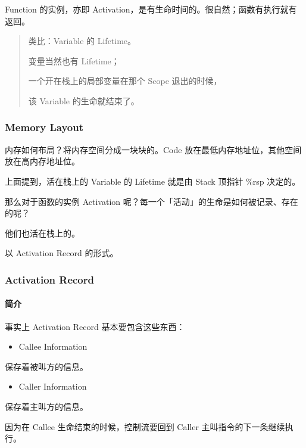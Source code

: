 \documentclass[
]{article}
\begin{document}
Function 的实例，亦即
Activation，是有生命时间的。很自然；函数有执行就有返回。

\begin{quote}
类比：Variable 的 Lifetime。

变量当然也有 Lifetime；

一个开在栈上的局部变量在那个 Scope 退出的时候，

该 Variable 的生命就结束了。
\end{quote}

\hypertarget{header-n183}{%
\subsubsection{Memory Layout}\label{header-n183}}

内存如何布局？将内存空间分成一块块的。Code
放在最低内存地址位，其他空间放在高内存地址位。

上面提到，活在栈上的 Variable 的 Lifetime 就是由 Stack 顶指针 \%rsp
决定的。

那么对于函数的实例 Activation
呢？每一个「活动」的生命是如何被记录、存在的呢？

他们也活在栈上的。

以 Activation Record 的形式。

\hypertarget{header-n189}{%
\subsubsection{Activation Record}\label{header-n189}}

\hypertarget{header-n190}{%
\paragraph{简介}\label{header-n190}}

事实上 Activation Record 基本要包含这些东西：

\begin{itemize}
\item
  Callee Information
\end{itemize}

保存着被叫方的信息。

\begin{itemize}
\item
  Caller Information
\end{itemize}

保存着主叫方的信息。

因为在 Callee 生命结束的时候，控制流要回到 Caller
主叫指令的下一条继续执行。
\end{document}
